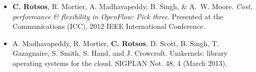 \begin{itemize}
  \item \textbf{C. Rotsos}, R. Mortier, A. Madhavapeddy, B. Singh, \& A.~W.
        Moore.  \textit{Cost, performance \& flexibility in OpenFlow: Pick
          three}. Presented at the Communications (ICC), 2012 IEEE International
        Conference. 

  \item A. Madhavapeddy, R. Mortier, \textbf{C. Rotsos}, D. Scott, B. Singh, T.
        Gazagnaire, S. Smith, S. Hand, and J.  Crowcroft. Unikernels: library
        operating systems for the cloud.  SIGPLAN Not. 48, 4 (March 2013). 

\end{itemize}


